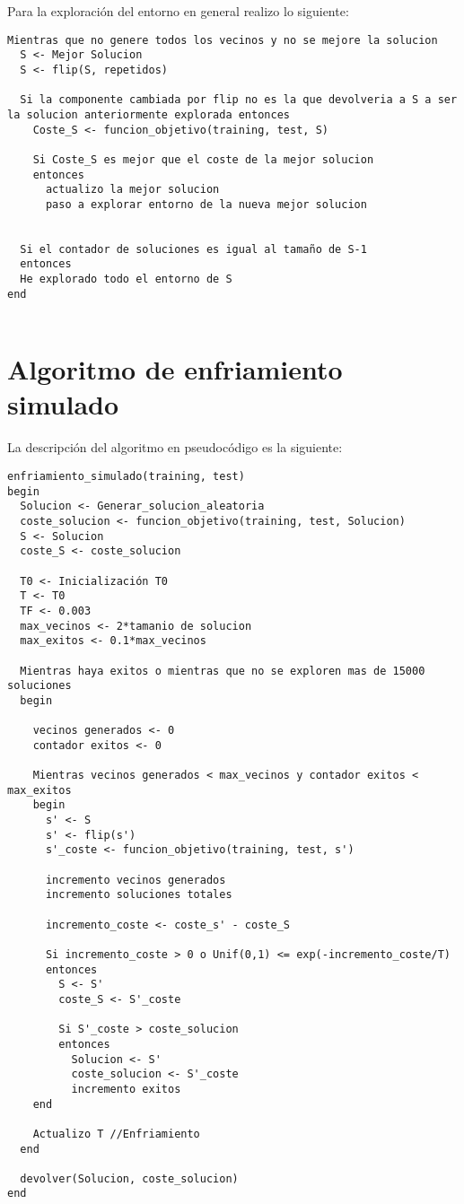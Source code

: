 Para la exploración del entorno en general realizo lo siguiente:
\begin{lstlisting}
Mientras que no genere todos los vecinos y no se mejore la solucion
  S <- Mejor Solucion
  S <- flip(S, repetidos)
  
  Si la componente cambiada por flip no es la que devolveria a S a ser la solucion anteriormente explorada entonces
    Coste_S <- funcion_objetivo(training, test, S)
    
    Si Coste_S es mejor que el coste de la mejor solucion
    entonces
      actualizo la mejor solucion
      paso a explorar entorno de la nueva mejor solucion
    
    
  Si el contador de soluciones es igual al tamaño de S-1
  entonces
  He explorado todo el entorno de S
end
  
\end{lstlisting}

\newpage

\section{Algoritmo de enfriamiento simulado}
La descripción del algoritmo en pseudocódigo es la siguiente:
\begin{lstlisting}
enfriamiento_simulado(training, test)
begin
  Solucion <- Generar_solucion_aleatoria
  coste_solucion <- funcion_objetivo(training, test, Solucion)
  S <- Solucion
  coste_S <- coste_solucion
  
  T0 <- Inicialización T0
  T <- T0
  TF <- 0.003
  max_vecinos <- 2*tamanio de solucion
  max_exitos <- 0.1*max_vecinos
  
  Mientras haya exitos o mientras que no se exploren mas de 15000 soluciones
  begin
  
    vecinos generados <- 0
    contador exitos <- 0
    
    Mientras vecinos generados < max_vecinos y contador exitos < max_exitos
    begin
      s' <- S
      s' <- flip(s')
      s'_coste <- funcion_objetivo(training, test, s')
      
      incremento vecinos generados
      incremento soluciones totales
      
      incremento_coste <- coste_s' - coste_S
      
      Si incremento_coste > 0 o Unif(0,1) <= exp(-incremento_coste/T)
      entonces
        S <- S'
        coste_S <- S'_coste
        
        Si S'_coste > coste_solucion
        entonces
          Solucion <- S'
          coste_solucion <- S'_coste
          incremento exitos
    end
    
    Actualizo T //Enfriamiento
  end
  
  devolver(Solucion, coste_solucion)      
end 
\end{lstlisting}

